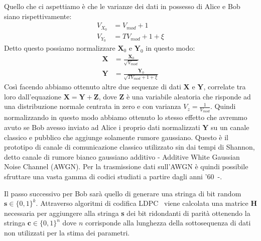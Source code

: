 Quello che ci aspettiamo \`e che le varianze dei dati in possesso di Alice e Bob siano rispettivamente:
\begin{equation}
\begin{split}
V_{X_0} &= V_{mod} + 1 \\
V_{Y_0} &= T V_{mod} + 1 + \xi
\end{split}
\end{equation}
Detto questo possiamo normalizzare $\textbf{X}_0$ e $\textbf{Y}_0$ in questo modo:
\begin{equation}
\begin{split}
\textbf{X} &= \frac{\textbf{X}_0}{\sqrt{V_{mod}}}\\
\textbf{Y} &= \frac{\textbf{Y}_0}{\sqrt{T V_{mod} + 1 + \xi}}
\end{split}
\end{equation}
Cos\`i facendo abbiamo ottenuto altre due sequenze di dati $\textbf{X}$ e $\textbf{Y}$, correlate tra loro dall'equazione $\textbf{X} = \textbf{Y} + \textbf{Z}$, dove $\textbf{Z}$ \`e una variabile aleatoria che risponde ad una distribuzione normale centrata in zero e con varianza $V_z = \frac{1}{V_{mod}}$. Quindi normalizzando in questo modo abbiamo ottenuto lo stesso effetto che avremmo avuto se Bob avesso inviato ad Alice i proprio dati normalizzati $\textbf{Y}$ su un canale classico e pubblico che aggiunge solamente rumore gaussiano\cite{milicevic_key_2018}. Questo è il prototipo di canale di comunicazione classico utilizzato sin dai tempi di Shannon, detto canale di rumore bianco gaussiano additivo - Additive White Gaussian Noise Channel (AWGN). Per la trasmissione dati sull'AWGN è quindi possibile sfruttare una vasta gamma di codici studiati a partire dagli anni '60~\cite{Gallager_1972}-\cite{richardson2008modern}. 

Il passo successivo per Bob sar\`a quello di generare una stringa di bit random $\textbf{s} \in \{0,1\}^k$. Attraverso algoritmi di codifica LDPC~\cite{borwankar_low_nodate} viene calcolata una matrice \textbf{H} necessaria per aggiungere alla stringa \textbf{s} dei bit ridondanti di parit\`a ottenendo la stringa $\textbf{c} \in \{0,1\}^n$ dove $n$ corrisponde alla lunghezza della sottosequenza di dati non utilizzati per la stima dei parametri.

